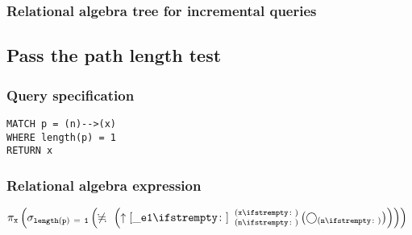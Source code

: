 
\subsubsection*{Relational algebra tree for incremental queries}


\subsection{Pass the path length test}

\subsubsection*{Query specification}

\begin{lstlisting}
MATCH p = (n)-->(x)
WHERE length(p) = 1
RETURN x
\end{lstlisting}

\subsubsection*{Relational algebra expression}

$\projection{\var{x}} \left(\selection{\mathtt{length(p)~=~1}} \left(\alldifferent{} \left(\expandout{\_e1}{}{n}{x}{} \left(\getvertices{n}{}\right)\right)\right)\right)$

